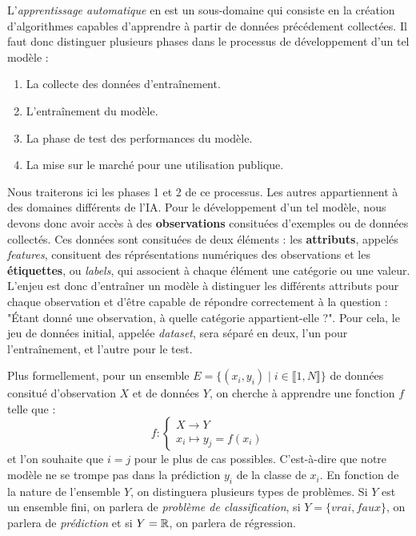 \medskip 

L'\emph{apprentissage automatique} en est un sous-domaine qui consiste en la création d'algorithmes capables  d'apprendre à partir de données précédement collectées.  Il faut donc distinguer plusieurs phases dans le processus de développement d'un tel modèle : 
\begin{enumerate}
    \item La collecte des données d'entraînement. 
    \item L'entraînement du modèle. 
    \item La phase de test des performances du modèle. 
    \item La mise sur le marché pour une utilisation publique. 
\end{enumerate}
Nous traiterons ici les phases 1 et 2 de ce processus. Les autres appartiennent à des domaines différents de l'IA.  Pour le développement d'un tel modèle, nous devons donc avoir accès à des \textbf{observations} consituées d'exemples ou de données collectés. Ces données sont consituées de deux éléments : les \textbf{attributs}, appelés \emph{features},  consituent des réprésentations numériques des observations et les \textbf{étiquettes}, ou \emph{labels}, qui  associent à chaque élément une catégorie ou une valeur. L'enjeu est donc d'entraîner un modèle à distinguer  les différents attributs pour chaque observation et d'être capable de répondre correctement à la question :  "Étant donné une observation, à quelle catégorie appartient-elle ?".  Pour cela, le jeu de données initial, appelée \emph{dataset}, sera séparé en deux, l'un pour l'entraînement, et l'autre  pour le test. 

\medskip

Plus formellement, pour un ensemble $E = \{(x_i, y_i) \mid i \in \llbracket 1, N \rrbracket\}$ de données consitué d'observation $X$ et de données $Y$, on 
cherche à apprendre une fonction $f$ telle que : 
    $$ f : 
        \begin{cases}
            X \longrightarrow Y \\ 
            x_i \longmapsto y_j = f(x_i)
        \end{cases}
    $$
et l'on souhaite que $i = j$ pour le plus de cas possibles. C'est-à-dire que notre modèle ne se trompe 
pas dans la prédiction $y_i$ de la classe de $x_i$. En fonction de la nature de l'ensemble $Y$, on distinguera plusieurs 
types de problèmes. Si $Y$ est un ensemble fini, on parlera de \emph{problème de classification}, si $Y = \{vrai, faux\}$, 
on parlera de \emph{prédiction} et si $Y = \mathbb{R}$, on parlera de régression. 

